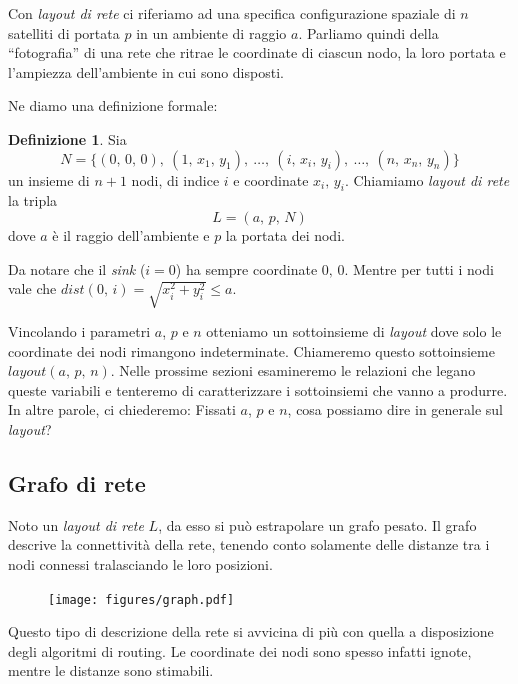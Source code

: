 \documentclass[a4paper,12pt]{article}
\theoremstyle{definition}
\newtheorem{definition}{Definizione}
\begin{document}
Con \emph{layout di rete} ci riferiamo ad una specifica configurazione spaziale di $n$ satelliti di portata $p$ in un ambiente di raggio $a$. Parliamo quindi della ``fotografia'' di una rete che ritrae le coordinate di ciascun nodo, la loro portata e l'ampiezza dell'ambiente in cui sono disposti.

Ne diamo una definizione formale:

\begin{definition}
Sia
\begin{equation*}
N = \{(0,\,0,\,0),\ (1,\,x_1,\,y_1),\ \dots,\ (i,\,x_i,\,y_i),\ \dots,\ (n,\,x_n,\,y_n)\}
\end{equation*}
un insieme di $n+1$ nodi, di indice $i$ e coordinate $x_i,\,y_i$. Chiamiamo \emph{layout di rete} la tripla
\begin{equation*}
L = (a,\,p,\,N)
\end{equation*}
dove $a$ è il raggio dell'ambiente e $p$ la portata dei nodi.
\end{definition}

Da notare che il \emph{sink} ($i=0$) ha sempre coordinate $0,\,0$. Mentre per tutti i nodi vale che $dist(0,\,i) = \sqrt{x_i^2+y_i^2} \leq a$.

Vincolando i parametri $a$, $p$ e $n$ otteniamo un sottoinsieme di \emph{layout} dove solo le coordinate dei nodi rimangono indeterminate. Chiameremo questo sottoinsieme $layout(a,\,p,\,n)$. Nelle prossime sezioni esamineremo le relazioni che legano queste variabili e tenteremo di caratterizzare i sottoinsiemi che vanno a produrre. In altre parole, ci chiederemo: Fissati $a$, $p$ e $n$, cosa possiamo dire in generale sul \emph{layout}?

\subsection{Grafo di rete}

Noto un \emph{layout di rete} $L$, da esso si può estrapolare un grafo pesato. Il grafo descrive la connettività della rete, tenendo conto solamente delle distanze tra i nodi connessi tralasciando le loro posizioni.

\begin{figure}[H]
\centering
\texttt{[image: figures/graph.pdf]}
\caption{}
\end{figure}

Questo tipo di descrizione della rete si avvicina di più con quella a disposizione degli algoritmi di routing. Le coordinate dei nodi sono spesso infatti ignote, mentre le distanze sono stimabili.
\end{document}
